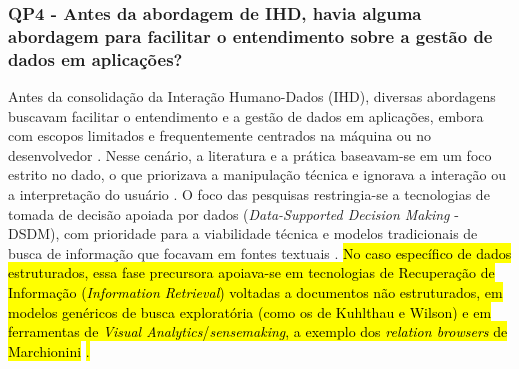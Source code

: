 \documentclass[
	12pt,				%
	oneside,			%
	a4paper,			%
	english,			%
	brazil				%
	]{abntex2ppgsi}
\newcommand{\hlcite}[1]{\colorbox{yellow}{\cite{#1}}} %
\begin{document}



    \subsubsection{QP4 - Antes da abordagem de IHD, havia alguma abordagem para facilitar o entendimento sobre a gestão de dados em aplicações?}

    Antes da consolidação da Interação Humano-Dados (IHD), diversas abordagens buscavam facilitar o entendimento e a gestão de dados em aplicações, embora com escopos limitados e frequentemente centrados na máquina ou no desenvolvedor \cite{Calvetti2021173, coleti2024human, Zou2020769, Locoro2020, Strey2019Human}. Nesse cenário, a literatura e a prática baseavam-se em um foco estrito no dado, o que priorizava a manipulação técnica e ignorava a interação ou a interpretação do usuário \cite{Capeleti2024Human}. O foco das pesquisas restringia-se a tecnologias de tomada de decisão apoiada por dados (\textit{Data-Supported Decision Making} - DSDM), com prioridade para a viabilidade técnica e modelos tradicionais de busca de informação que focavam em fontes textuais \cite{sailaja2021exploring, Koesten2021}. \hl{No caso específico de dados estruturados, essa fase precursora apoiava-se em tecnologias de Recuperação de Informação (\textit{Information Retrieval}) voltadas a documentos não estruturados, em modelos genéricos de busca exploratória (como os de Kuhlthau e Wilson) e em ferramentas de \textit{Visual Analytics}/\textit{sensemaking}, a exemplo dos \textit{relation browsers} de Marchionini} \hlcite{koesten2017trials}\hl{.}
\end{document}
